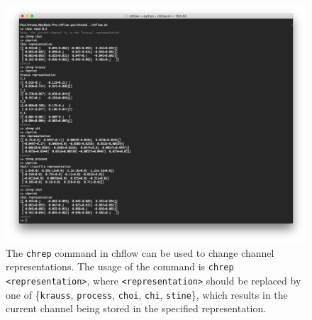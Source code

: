\documentclass[12pt]{article}
\begin{document}
\begin{figure}[H]
\begin{center}
\includegraphics[scale=0.4]{chreps_screen.pdf}
\caption{The \texttt{chrep} command in chflow can be used to change channel representations. The usage of the command is \texttt{chrep <representation>}, where \texttt{<representation>} should be replaced by one of \{\texttt{krauss}, \texttt{process}, \texttt{choi}, \texttt{chi}, \texttt{stine}\}, which results in the current channel being stored in the specified representation.}
\label{fig:chrep_screen}
\end{center}
\end{figure}
\end{document}

